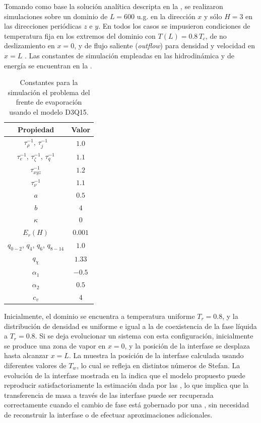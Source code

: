 Tomando como base la soluci\'on anal\'itica descripta en la , se realizaron simulaciones sobre un dominio de $L=600$ u.g. en la direcci\'on $x$ y s\'olo $H=3$ en las direcciones peri\'odicas $z$ e $y$. En todos los casos se impusieron condiciones de temperatura fija en los extremos del dominio con $T(L) = 0.8 \, T_c$, de no deslizamiento en $x=0$, y de flujo saliente (\emph{outflow}) para densidad y velocidad en $x=L$ \cite{lou_evaluation_2013}. Las constantes de simulaci\'on empleadas en las \lbe{} hidrodin\'amica y de energ\'ia se encuentran en la . 

\begin{table}[ht]
	\centering
    \begin{tabular}{c c}
	    \toprule
        \bf Propiedad & \bf Valor \\
        \midrule
        $\tau_{\rho}^{-1}$, $\tau_{j}^{-1}$ & $1.0$ \\
        $\tau_{e}^{-1}$, $\tau_{\zeta}^{-1}$, $\tau_{q}^{-1}$ & $1.1$ \\
        $\tau_{xyz}^{-1}$ & $1.2$ \\
        $\tau_{\nu}^{-1}$ & $1.1$ \\
		$a$ & $0.5$ \\
		$b$ & $4$ \\
		$\kappa$   & 0 \\
		$E_r (H)$  & $0.001$ \\
		$q_{0-2}$, $q_4$, $q_{6}$, $q_{8-14}$ & $1.0$ \\
		$q_{\chi}$ & $1.33$ \\
		$\alpha_1$ & $-0.5$ \\
		$\alpha_2$ & $0.5$ \\
		$c_v$      & $4$ \\
        \bottomrule
	\end{tabular}
	\caption{Constantes para la simulaci\'on el problema del frente de evaporaci\'on usando el modelo D3Q15.}
	\label{tab:stefan3D_prop}
\end{table} 

Inicialmente, el dominio se encuentra a temperatura uniforme $T_r = 0.8$, y la distribuci\'on de densidad es uniforme e igual a la de coexistencia de la fase l\'iquida a $T_r = 0.8$. Si se deja evolucionar un sistema con esta configuraci\'on, inicialmente se produce una zona de vapor en $x=0$, y la posici\'on de la interfase se desplaza hasta alcanzar $x=L$. La  muestra la posici\'on de la interfase calculada usando diferentes valores de $T_w$, lo cual se refleja en distintos n\'umeros de Stefan. La evoluci\'on de la interfase mostrada en la  indica que el modelo propuesto puede reproducir satisfactoriamente la estimaci\'on dada por las , lo que implica que la transferencia de masa a trav\'es de las interfase puede ser recuperada correctamente cuando el cambio de fase est\'a gobernado por una \eos{}, sin necesidad de reconstruir la interfase o de efectuar aproximaciones adicionales.

